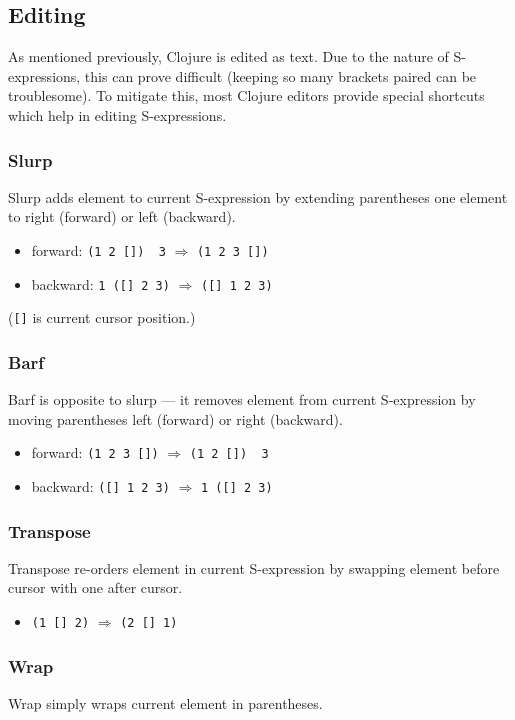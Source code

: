 \documentclass[11pt]{scrartcl}
\begin{document}
\subsection{Editing}
\label{sec:editing}
As mentioned previously, Clojure is edited as text.
Due to the nature of S-expressions, this can prove difficult (keeping so many
brackets paired can be troublesome).
To mitigate this, most Clojure editors provide special shortcuts which help in
editing S-expressions.

\subsubsection*{Slurp}
Slurp adds element to current S-expression by extending parentheses one element
to right (forward) or left (backward).

\begin{itemize}
\item forward: \lstinline|(1 2 [])  3| $\Rightarrow$ \lstinline|(1 2 3 [])|
\item backward: \lstinline|1 ([] 2 3)| $\Rightarrow$ \lstinline|([] 1 2 3)|
\end{itemize}
(\lstinline{[]} is current cursor position.)

\subsubsection*{Barf}
Barf is opposite to slurp --- it removes element from current S-expression by
moving parentheses left (forward) or right (backward).
\begin{itemize}
\item forward: \lstinline|(1 2 3 [])| $\Rightarrow$ \lstinline|(1 2 [])  3|
\item backward: \lstinline|([] 1 2 3)| $\Rightarrow$ \lstinline|1 ([] 2 3)|
\end{itemize}

\subsubsection*{Transpose}
Transpose re-orders element in current S-expression by swapping element before
cursor with one after cursor.
\begin{itemize}
\item \lstinline|(1 [] 2)| $\Rightarrow$ \lstinline|(2 [] 1)|
\end{itemize}

\subsubsection*{Wrap}
Wrap simply wraps current element in parentheses.
\end{document}
